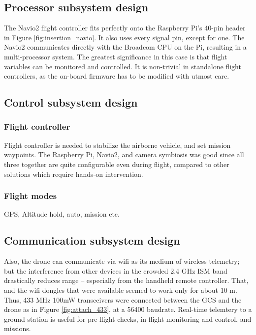 \subsection{Processor subsystem design}

The Navio2 flight controller fits perfectly onto the Raspberry Pi's 40-pin header in Figure \ref{fig:insertion_navio}. It also uses every signal pin, except for one. The Navio2 communicates directly with the Broadcom CPU on the Pi, resulting in a multi-processor system. The greatest significance in this case is that flight variables can be monitored and controlled. It is non-trivial in standalone flight controllers, as the on-board firmware has to be modified with utmost care.

\subsection{Control subsystem design}

\subsubsection{Flight controller}
Flight controller is needed to stabilize the airborne vehicle, and set mission waypoints. The Raspberry Pi, Navio2, and camera symbiosis was good since all three together are quite configurable even during flight, compared to other solutions which require hands-on intervention.

\subsubsection{Flight modes}

GPS, Altitude hold, auto, mission etc.

\subsection{Communication subsystem design}

Also, the drone can communicate via wifi as its medium of wireless telemetry; but the interference from other devices in the crowded 2.4 GHz ISM band drastically reduces range -- especially from the handheld remote controller. That, and the wifi dongles that were available seemed to work only for about 10 m.\\

Thus, 433 MHz 100mW transceivers were connected between the GCS and the drone as in Figure \ref{fig:attach_433}, at a 56400 baudrate. Real-time telemtery to a ground station is useful for pre-flight checks, in-flight monitoring and control, and missions.\\

